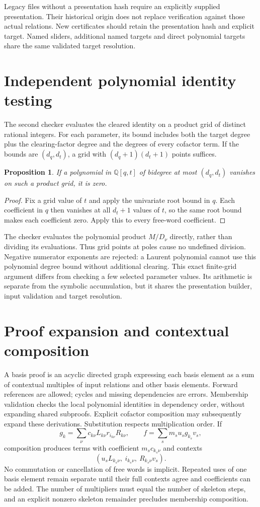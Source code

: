 \documentclass[11pt]{article}
\newcommand{\Q}{\mathbb Q}
\newtheorem{proposition}{Proposition}
\begin{document}
Legacy files without a presentation hash require an explicitly supplied
presentation. Their historical origin does not replace verification against
those actual relations. New certificates should retain the presentation hash
and explicit target. Named sliders, additional named targets and direct
polynomial targets share the same validated target resolution.

\section{Independent polynomial identity testing}
The second checker evaluates the cleared identity on a product grid of distinct
rational integers. For each parameter, its bound includes both the target
degree plus the clearing-factor degree and the degrees of every cofactor term.
If the bounds are $(d_q,d_t)$, a grid with $(d_q+1)(d_t+1)$ points suffices.

\begin{proposition}
If a polynomial in $\Q[q,t]$ of bidegree at most $(d_q,d_t)$ vanishes on such a
product grid, it is zero.
\end{proposition}
\begin{proof}
Fix a grid value of $t$ and apply the univariate root bound in $q$. Each
coefficient in $q$ then vanishes at all $d_t+1$ values of $t$, so the same
root bound makes each coefficient zero. Apply this to every free-word coefficient.
\end{proof}

The checker evaluates the polynomial product $M/D_\nu$ directly, rather than
dividing its evaluations. Thus grid points at poles cause no undefined
division. Negative numerator exponents are rejected: a Laurent polynomial
cannot use this polynomial degree bound without additional clearing.
This exact finite-grid argument differs from checking a few selected parameter
values. Its arithmetic is separate from the symbolic accumulation, but it
shares the presentation builder, input validation and target resolution.

\section{Proof expansion and contextual composition}
A basis proof is an acyclic directed graph expressing each basis element as a
sum of contextual multiples of input relations and other basis elements.
Forward references are allowed; cycles and missing dependencies are errors.
Membership validation checks the local polynomial identities in dependency
order, without expanding shared subproofs. Explicit cofactor composition may
subsequently expand these derivations. Substitution respects multiplication order. If
\[
 g_k=\sum_\nu c_{k\nu}L_{k\nu}r_{i_{k\nu}}R_{k\nu},
 \qquad f=\sum_s m_s u_sg_{k_s}v_s,
\]
composition produces terms with coefficient $m_sc_{k_s\nu}$ and contexts
\[
          (u_sL_{k_s\nu},\ i_{k_s\nu},\ R_{k_s\nu}v_s).
\]
No commutation or cancellation of free words is implicit. Repeated uses of one
basis element remain separate until their full contexts agree and coefficients
can be added. The number of multipliers must equal the number of skeleton steps,
and an explicit nonzero skeleton remainder precludes membership composition.
\end{document}
